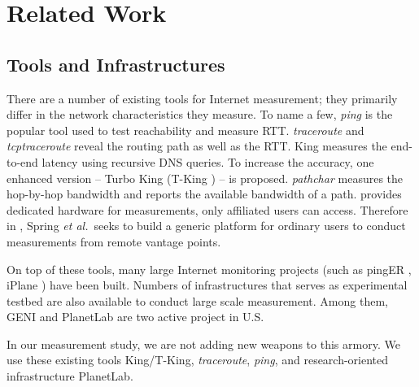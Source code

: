 \section{Related Work}
\label{sec:related-work}


\subsection{Tools and Infrastructures}
\label{sec:tools}

There are a number of existing tools for Internet measurement; they primarily differ in the network characteristics they measure. To name a few, {\em ping} is the popular tool used to test reachability and measure RTT. {\em traceroute} \cite{jacobson1989traceroute} and {\em tcptraceroute} \cite{toren2001tcptraceroute} reveal the routing path as well as the RTT. King \cite{gummadi2002king} measures the end-to-end latency using recursive DNS queries. To increase the accuracy, one enhanced version -- Turbo King (T-King \cite{leonard2008turbo}) -- is proposed. {\em pathchar} \cite{jacobson1997pathchar} measures the hop-by-hop bandwidth and \cite{jain2002pathload} reports the available bandwidth of a path. \cite{paxson2002experiences} provides dedicated hardware for measurements, only affiliated  users can access. Therefore in \cite{spring2003scriptroute}, Spring {\em et al.}\, seeks to build a generic platform for ordinary users to conduct measurements from remote vantage points.

On top of these tools, many large Internet monitoring projects (such as pingER \cite{matthews2000pinger}, iPlane \cite{madhyastha2006iplane}) have been built. Numbers of infrastructures that serves as experimental testbed are also available to conduct large scale measurement. Among them, GENI \cite{elliott2008geni} and PlanetLab \cite{chun2003planetlab} are two active project in U.S.  


In our measurement study, we are not adding new weapons to this armory. We use these existing tools King/T-King, {\it traceroute}, {\it ping}, and research-oriented infrastructure PlanetLab.

